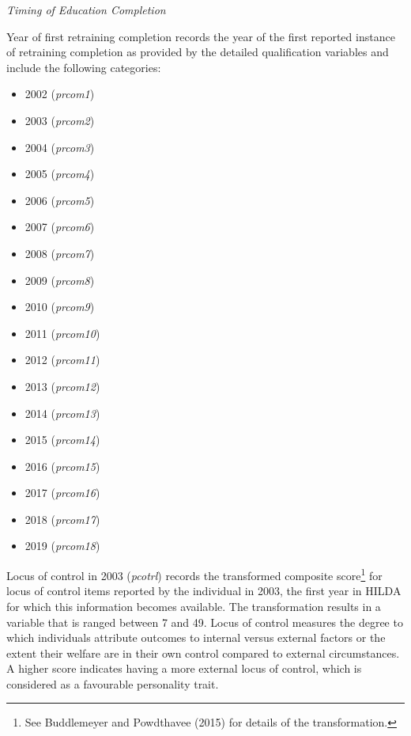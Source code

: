 \documentclass[12pt, a4paper]{article}
\begin{document}
\emph{Timing of Education Completion}

Year of first retraining completion records the year of the first reported instance of retraining completion as provided by the detailed qualification variables and include the following categories:
\begin{itemize}
  \item 2002 (\textit{p\textunderscore{}rcom1})
  \item 2003 (\textit{p\textunderscore{}rcom2})
  \item 2004 (\textit{p\textunderscore{}rcom3})
  \item 2005 (\textit{p\textunderscore{}rcom4})
  \item 2006 (\textit{p\textunderscore{}rcom5})
  \item 2007 (\textit{p\textunderscore{}rcom6})
  \item 2008 (\textit{p\textunderscore{}rcom7})
  \item 2009 (\textit{p\textunderscore{}rcom8})
  \item 2010 (\textit{p\textunderscore{}rcom9})
  \item 2011 (\textit{p\textunderscore{}rcom10})
  \item 2012 (\textit{p\textunderscore{}rcom11})
  \item 2013 (\textit{p\textunderscore{}rcom12})
  \item 2014 (\textit{p\textunderscore{}rcom13})
  \item 2015 (\textit{p\textunderscore{}rcom14})
  \item 2016 (\textit{p\textunderscore{}rcom15})
  \item 2017 (\textit{p\textunderscore{}rcom16})
  \item 2018 (\textit{p\textunderscore{}rcom17})
  \item 2019 (\textit{p\textunderscore{}rcom18})
\end{itemize}  
  
Locus of control in 2003 (\textit{p\textunderscore{}cotrl}) records the transformed composite score\footnote{See Buddlemeyer and Powdthavee (2015) for details of the transformation.} for locus of control items reported by the individual in 2003, the first year in HILDA for which this information becomes available. The transformation results in a variable that is ranged between 7 and 49. Locus of control measures the degree to which individuals attribute outcomes to internal versus external factors or the extent their welfare are in their own control compared to external circumstances. A higher score indicates having a more external locus of control, which is considered as a favourable personality trait. 
\end{document}

